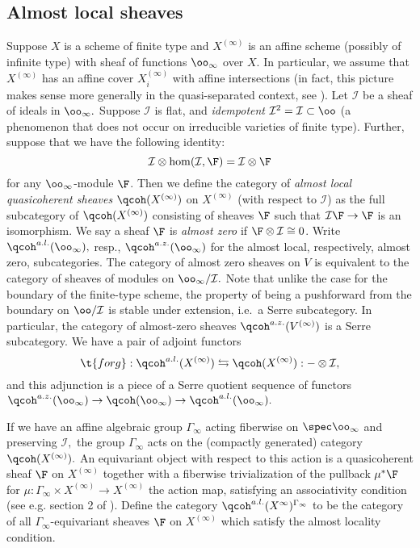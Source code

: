 \documentclass{article}
\newcommand{\I}{\mathcal{I}}
\begin{document}
\subsection{Almost local sheaves}
Suppose $X$ is a scheme of finite type and $X^{(\infty)}$ is an affine scheme (possibly of infinite type) with sheaf of functions $\oo_\infty$ over $X$. In particular, we assume that $X^{(\infty)}$ has an affine cover $X_i^{(\infty)}$ with affine intersections (in fact, this picture makes sense more generally in the quasi-separated context, see \cite{gabber-romero}). Let $\I$ be a sheaf of ideals in $\oo_\infty.$ Suppose $\I$ is flat, and \emph{idempotent} $\I^2 = \I\subset \oo$ (a phenomenon that does not occur on irreducible varieties of finite type). Further, suppose that we have the following identity:
$$\I\otimes \hom(\I, \F) = \I\otimes \F$$ for any $\oo_\infty$-module $\F$. Then we define the category of \emph{almost local quasicoherent sheaves} $\qcoh(X^{(\infty)})$ on $X^{(\infty)}$ (with respect to $\I$) as the full subcategory of $\qcoh(X^{(\infty)})$ consisting of sheaves $\F$ such that $\I \F\to \F$ is an isomorphism. We say a sheaf $\F$ is \emph{almost zero} if $\F\otimes \I \cong 0$. Write $\qcoh^{a.l.}(\oo_\infty),$ resp., $\qcoh^{a.z.}(\oo_\infty)$ for the almost local, respectively, almost zero, subcategories. The category of almost zero sheaves on $V$ is equivalent to the category of sheaves of modules on $\oo_\infty/\I.$ Note that unlike the case for the boundary of the finite-type scheme, the property of being a pushforward from the boundary on $\oo/\I$ is stable under extension, i.e.\ a Serre subcategory. In particular, the category of almost-zero sheaves $\qcoh^{a.z.}(V^{(\infty)})$ is a Serre subcategory.  We have a pair of adjoint functors $$\t{forg}:\qcoh^{a.l.}(X^{(\infty)})\leftrightarrows \qcoh(X^{(\infty)}):-\otimes \I,$$ and this adjunction is a piece of a Serre quotient sequence of functors $\qcoh^{a.z.}(\oo_\infty)\to \qcoh(\oo_\infty)\to \qcoh^{a.l.}(\oo_\infty).$

If we have an affine algebraic group $\Gamma_\infty$ acting fiberwise on $\spec \oo_\infty$ and preserving $\I,$ the group $\Gamma_\infty$ acts on the (compactly generated) category $\qcoh(X^{(\infty)}).$ An equivariant object with respect to this action is a quasicoherent sheaf $\F$ on $X^{(\infty)}$ together with a fiberwise trivialization of the pullback $\mu^*\F$ for $\mu:\Gamma_\infty\times X^{(\infty)}\to X^{(\infty)}$ the action map, satisfying an associativity condition (see e.g. section 2 of \cite{vtor}). Define the category $\qcoh^{a.l.}(X^{\infty})^{\Gamma_\infty}$ to be the category of all $\Gamma_\infty$-equivariant sheaves $\F$ on $X^{(\infty)}$ which satisfy the almost locality condition.
\end{document}

